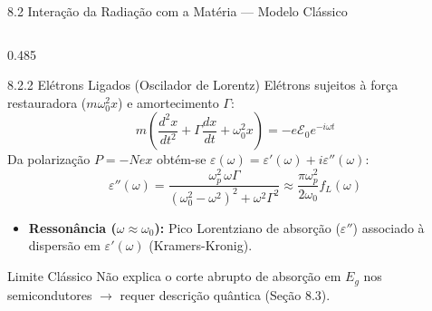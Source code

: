 \documentclass[aspectratio=169, 9pt]{beamer}
\begin{document}
\begin{frame}[shrink=2]{8.2 Interação da Radiação com a Matéria --- Modelo Clássico}
\begin{columns}[T, onlytextwidth]
    \begin{column}{0.485\textwidth}
      \begin{block}{8.2.2 Elétrons Ligados (Oscilador de Lorentz)}
        Elétrons sujeitos à força restauradora ($m\omega_0^2 x$) e amortecimento $\Gamma$:
        \[
          m\left(\frac{d^2x}{dt^2} + \Gamma\frac{dx}{dt} + \omega_0^2 x\right) = -e\mathcal{E}_0 e^{-i\omega t}
        \]
        Da polarização $P = -Nex$ obtém-se $\varepsilon(\omega) = \varepsilon'(\omega) + i\varepsilon''(\omega)$:
        \[
          \varepsilon''(\omega) = \frac{\omega_p^2\,\omega\Gamma}{(\omega_0^2 - \omega^2)^2 + \omega^2\Gamma^2} \approx \frac{\pi\omega_p^2}{2\omega_0} f_L(\omega)
        \]
        \begin{itemize}
          \item \textbf{Ressonância ($\omega \approx \omega_0$):} Pico Lorentziano de absorção ($\varepsilon''$) associado à dispersão em $\varepsilon'(\omega)$ (Kramers-Kronig).
        \end{itemize}
      \end{block}
      \vspace{-0.15cm}
      \begin{alertblock}{Limite Clássico}
        \scriptsize Não explica o corte abrupto de absorção em $E_g$ nos semicondutores $\rightarrow$ requer descrição quântica (Seção 8.3).
      \end{alertblock}
    \end{column}
  \end{columns}
\end{frame}
\end{document}
